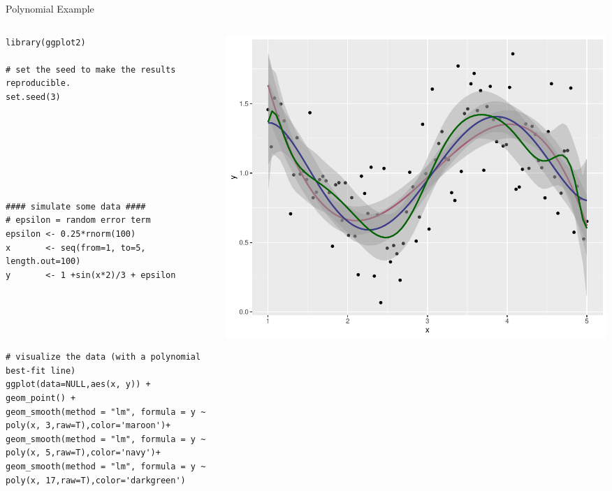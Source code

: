 \documentclass[11pt,handout,xcolor=pdftex,dvipsnames,table,mathserif,aspectratio=169]{beamer}
\begin{document}
\begin{frame}[fragile]{Polynomial Example}
\begin{columns}
\begin{column}{0.5\textwidth}
 \tiny
\begin{verbatim}
library(ggplot2)    

# set the seed to make the results reproducible.
set.seed(3)







#### simulate some data ####
# epsilon = random error term
epsilon <- 0.25*rnorm(100)
x       <- seq(from=1, to=5, length.out=100)
y       <- 1 +sin(x*2)/3 + epsilon





# visualize the data (with a polynomial best-fit line)
ggplot(data=NULL,aes(x, y)) + geom_point() + 
geom_smooth(method = "lm", formula = y ~ poly(x, 3,raw=T),color='maroon')+
geom_smooth(method = "lm", formula = y ~ poly(x, 5,raw=T),color='navy')+
geom_smooth(method = "lm", formula = y ~ poly(x, 17,raw=T),color='darkgreen')
\end{verbatim}
\end{column}
\begin{column}{0.5\textwidth}  %
    \begin{center}
    \includegraphics[width=\textwidth]{./resources/poly.pdf}
     \end{center}
\end{column}
\end{columns}
\end{frame}
\end{document}
